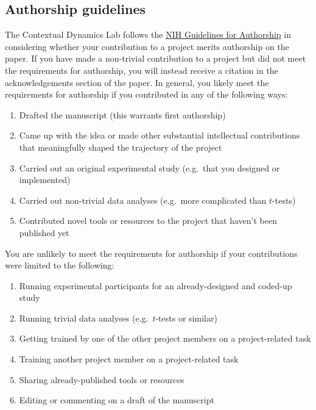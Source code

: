 \documentclass{tufte-book} %
\begin{document}
\subsection{Authorship guidelines}
  The Contextual Dynamics Lab follows
the
\href{https://oir.nih.gov/sites/default/files/uploads/sourcebook/documents/ethical_conduct/guidelines-authorship_contributions.pdf}{NIH
  Guidelines for Authorship} in considering whether your contribution
to a project merits authorship on the paper.  If you have made a
non-trivial contribution to a project but did not meet the
requirements for authorship, you will instead receive a citation in
the acknowledgements section of the paper.  In general, you likely
meet the requirements for authorship if you contributed in any of the
following ways:
\begin{enumerate}
\item Drafted the manuscript (this warrants first authorship)
\item Came up with the idea or made other substantial intellectual
  contributions that meaningfully shaped the trajectory of the project
\item Carried out an original experimental study (e.g.\ that you
  designed or implemented)
\item Carried out non-trivial data analyses (e.g.\ more complicated
  than $t$-tests)
\item Contributed novel tools or resources to the project that haven't
  been published yet
\end{enumerate}

  You are unlikely to
meet the requirements for authorship if your contributions were
limited to the following:
\begin{enumerate}
  \item Running experimental participants for an already-designed and
    coded-up study
  \item Running trivial data analyses (e.g.\ $t$-tests or similar)
  \item Getting trained by one of the other project members on a
    project-related task
  \item Training another project member on a project-related task
  \item Sharing already-published tools or resources
  \item Editing or commenting on a draft of the manuscript
\end{enumerate}
\end{document}
